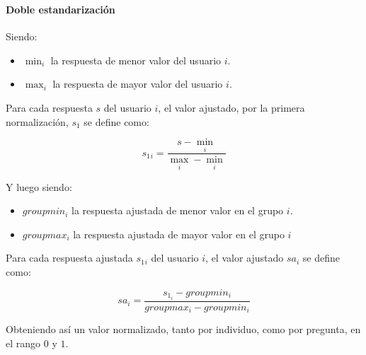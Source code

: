 \begin{frame}[noframenumbering]
\frametitle{\apendixframetitle}
\framesubtitle{Doble estandarización}

\scriptsize
Siendo:
\begin{itemize}
	\item $\min_i$ la respuesta de menor valor del usuario $i$.
	\item $\max_i$ la respuesta de mayor valor del usuario $i$.
\end{itemize}

Para cada respuesta $s$ del usuario $i$, el valor ajustado, por la primera
normalización, $s_1$ se define como:

\begin{equation}
s_1{_i}=\frac{s-\min_i}{\max_i-\min_i}
\end{equation}

Y luego siendo:
\begin{itemize}
	\item $groupmin_i$ la respuesta ajustada de menor valor en el grupo $i$.
	\item $groupmax_i$ la respuesta ajustada de mayor valor en el grupo $i$
\end{itemize}

Para cada respuesta ajustada $s_1{_i}$ del usuario $i$, el valor ajustado $sa_i$ se
define como:	

\begin{equation}
sa_i=\frac{s_{1_i}-groupmin_i}{groupmax_i-groupmin_i}
\end{equation}

Obteniendo así un valor normalizado, tanto por individuo, como por pregunta, en
el rango $0$ y $1$.

\end{frame}
